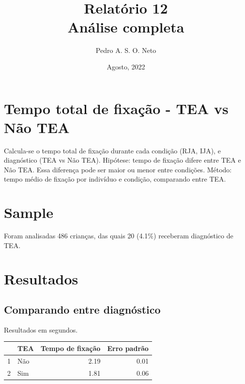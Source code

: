 \documentclass{article}
\title{Relatório 12 \\ Análise completa}
\author{Pedro A. S. O. Neto}
\date{Agosto, 2022}
\begin{document}
\maketitle

\section{Tempo total de fixação - TEA vs Não TEA}

Calcula-se o tempo total de fixação durante cada condição (RJA, IJA), e diagnóstico (TEA vs Não TEA). Hipótese: tempo de fixação difere entre TEA e Não TEA. Essa diferença pode ser maior ou menor entre condições. Método: tempo médio de fixação por indivíduo e condição, comparando entre TEA.

\section{Sample}

Foram analisadas 486 crianças, das quais 20 (4.1\%) receberam diagnóstico de TEA.


\section{Resultados}

\subsection{Comparando entre diagnóstico}

Resultados em segundos.

\begin{table}[ht]
\centering
\begin{tabular}{rlrr}
  \hline
  & TEA & Tempo de fixação & Erro padrão \\
  \hline
  1 & Não & 2.19 & 0.01 \\
  2 & Sim & 1.81 & 0.06 \\
   \hline
\end{tabular}
\end{table}
\end{document}
